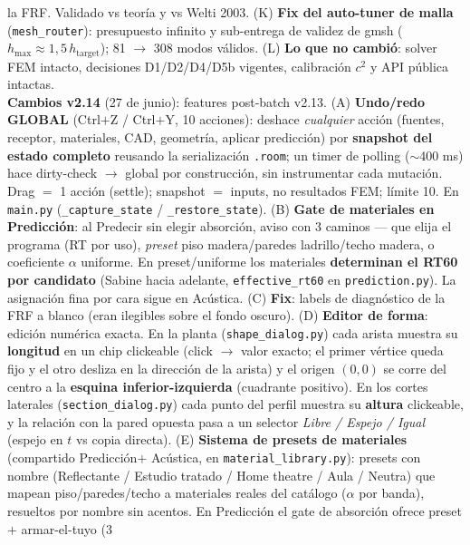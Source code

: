 \documentclass[11pt, a4paper]{article}
\begin{document}
\begin{center}
{    la FRF. Validado vs teoría y vs Welti 2003.
    (K) \textbf{Fix del auto-tuner de malla} (\texttt{mesh\_router}): presupuesto
    infinito y sub-entrega de validez de gmsh
    ($h_\text{max}\approx 1{,}5\,h_\text{target}$); 81 $\to$ 308 modos válidos.
    (L) \textbf{Lo que no cambió}: solver FEM intacto, decisiones D1/D2/D4/D5b
    vigentes, calibración $c^2$ y API pública intactas.\\[2pt]
    \textbf{Cambios v2.14} (27 de junio): features post-batch v2.13.
    (A) \textbf{Undo/redo GLOBAL} (Ctrl$+$Z / Ctrl$+$Y, 10 acciones): deshace
    \emph{cualquier} acción (fuentes, receptor, materiales, CAD, geometría,
    aplicar predicción) por \textbf{snapshot del estado completo} reusando la
    serialización \texttt{.room}; un timer de polling ($\sim$400 ms) hace
    dirty-check $\to$ global por construcción, sin instrumentar cada mutación.
    Drag $=$ 1 acción (settle); snapshot $=$ inputs, no resultados FEM; límite
    10. En \texttt{main.py} (\texttt{\_capture\_state} / \texttt{\_restore\_state}).
    (B) \textbf{Gate de materiales en Predicción}: al Predecir sin elegir
    absorción, aviso con 3 caminos --- que elija el programa (RT por uso),
    \emph{preset} piso madera/paredes ladrillo/techo madera, o coeficiente
    $\alpha$ uniforme. En preset/uniforme los materiales \textbf{determinan el
    RT60 por candidato} (Sabine hacia adelante, \texttt{effective\_rt60} en
    \texttt{prediction.py}). La asignación fina por cara sigue en Acústica.
    (C) \textbf{Fix}: labels de diagnóstico de la FRF a blanco (eran ilegibles
    sobre el fondo oscuro).
    (D) \textbf{Editor de forma}: edición numérica exacta. En la planta
    (\texttt{shape\_dialog.py}) cada arista muestra su \textbf{longitud} en un
    chip clickeable (click $\to$ valor exacto; el primer vértice queda fijo y el
    otro desliza en la dirección de la arista) y el origen $(0,0)$ se corre del
    centro a la \textbf{esquina inferior-izquierda} (cuadrante positivo). En los
    cortes laterales (\texttt{section\_dialog.py}) cada punto del perfil muestra
    su \textbf{altura} clickeable, y la relación con la pared opuesta pasa a un
    selector \emph{Libre / Espejo / Igual} (espejo en $t$ vs copia directa).
    (E) \textbf{Sistema de presets de materiales} (compartido Predicción$+$
    Acústica, en \texttt{material\_library.py}): presets con nombre (Reflectante /
    Estudio tratado / Home theatre / Aula / Neutra) que mapean piso/paredes/techo a
    materiales reales del catálogo ($\alpha$ por banda), resueltos por nombre sin
    acentos. En Predicción el gate de absorción ofrece preset $+$ armar-el-tuyo (3
}
\end{center}
\end{document}

